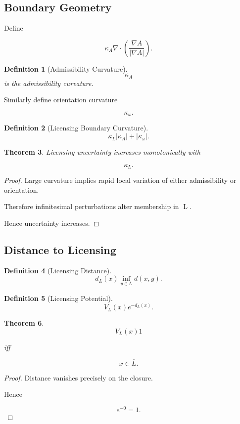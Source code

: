 \documentclass[12pt]{article}
\newtheorem{theorem}{Theorem}[section]
\newtheorem{definition}[theorem]{Definition}
\theoremstyle{remark}
\begin{document}
\subsection{Boundary Geometry}

Define

\[
\kappa_A
\nabla\cdot
\left(
\frac{\nabla A}
{|\nabla A|}
\right).
\]

\begin{definition}[Admissibility Curvature]
\[
\kappa_A
\]
is the admissibility curvature.
\end{definition}

Similarly define orientation curvature

\[
\kappa_\omega.
\]
\begin{definition}[Licensing Boundary Curvature]
\[
\kappa_L
|\kappa_A|
+
|\kappa_\omega|.
\]
\end{definition}

\begin{theorem}
Licensing uncertainty increases monotonically with

\[
\kappa_L.
\]
\end{theorem}
\begin{proof}
Large curvature implies rapid local variation of either admissibility or orientation.

Therefore infinitesimal perturbations alter membership in L.

Hence uncertainty increases.
\end{proof}

\subsection{Distance to Licensing}

\begin{definition}[Licensing Distance]
\[
d_L(x)
\inf_{y\in L}
d(x,y).
\]
\end{definition}

\begin{definition}[Licensing Potential]
\[
V_L(x)
e^{-d_L(x)}.
\]
\end{definition}

\begin{theorem}
\[
V_L(x)
1
\]

iff

\[
x\in \overline L.
\]
\end{theorem}
\begin{proof}
Distance vanishes precisely on the closure.

Hence

\[
e^{-0}=1.
\]
\end{proof}
\end{document}
